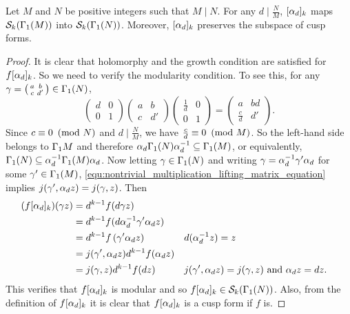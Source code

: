       \begin{proposition}
        Let $M$ and $N$ be positive integers such that $M \mid N$. For any $d \mid \frac{N}{M}$, $[\alpha_{d}]_{k}$ maps $\mathcal{S}_{k}(\Gamma_{1}(M))$ into $\mathcal{S}_{k}(\Gamma_{1}(N))$. Moreover, $[\alpha_{d}]_{k}$ preserves the subspace of cusp forms.
      \end{proposition}
      \begin{proof}
        It is clear that holomorphy and the growth condition are satisfied for $f[\alpha_{d}]_{k}$. So we need to verify the modularity condition. To see this, for any $\gamma = \begin{psmallmatrix} a & b \\ c & d' \end{psmallmatrix} \in \Gamma_{1}(N)$,
        \begin{equation}\label{equ:nontrivial_multiplication_lifting_matrix_equation}
          \begin{pmatrix} d & 0 \\ 0 & 1 \end{pmatrix}\begin{pmatrix} a & b \\ c & d' \end{pmatrix}\begin{pmatrix} \frac{1}{d} & 0 \\ 0 & 1 \end{pmatrix} = \begin{pmatrix} a & bd \\ \frac{c}{d} & d' \end{pmatrix}.
        \end{equation}
        Since $c \equiv 0 \ \left(\text{mod }N\right)$ and $d \mid \frac{N}{M}$, we have $\frac{c}{d} \equiv 0 \ \left(\text{mod }M\right)$. So the left-hand side belongs to $\Gamma_{1}M$ and therefore $\alpha_{d}\Gamma_{1}(N)\alpha_{d}^{-1} \subseteq \Gamma_{1}(M)$, or equivalently, $\Gamma_{1}(N) \subseteq \alpha_{d}^{-1}\Gamma_{1}(M)\alpha_{d}$. Now letting $\gamma \in \Gamma_{1}(N)$ and writing $\gamma = \alpha_{d}^{-1}\gamma'\alpha_{d}$ for some $\gamma' \in \Gamma_{1}(M)$, \cref{equ:nontrivial_multiplication_lifting_matrix_equation} implies $j(\gamma',\alpha_{d}z) = j(\gamma,z)$. Then 
        \begin{align*}
          (f[\alpha_{d}]_{k})(\gamma z) &= d^{k-1}f(d \gamma z) \\
          &= d^{k-1}f(d\alpha_{d}^{-1}\gamma'\alpha_{d}z) \\
          &= d^{k-1}f\left(\gamma'\alpha_{d}z\right) && \text{$d(\alpha_{d}^{-1}z) = z$}\\
          &= j(\gamma',\alpha_{d}z)d^{k-1}f(\alpha_{d}z) \\
          &= j(\gamma,z)d^{k-1}f(dz) && \text{$j(\gamma',\alpha_{d}z) = j(\gamma,z)$ and $\alpha_{d}z = dz$.}
        \end{align*}
        This verifies that $f[\alpha_{d}]_{k}$ is modular and so $f[\alpha_{d}]_{k} \in \mathcal{S}_{k}(\Gamma_{1}(N))$. Also, from the definition of $f[\alpha_{d}]_{k}$ it is clear that $f[\alpha_{d}]_{k}$ is a cusp form if $f$ is. 
      \end{proof}


